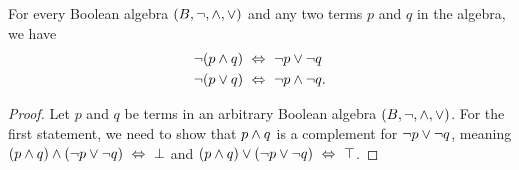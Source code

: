 \begin{theorem}
    For every Boolean algebra $(B, \neg, \wedge, \vee)$ and any two terms $p$ and $q$ in the algebra,
    we have
    \begin{align*}
        \neg (p \wedge q) &~\Leftrightarrow~ \neg p \vee \neg q\\
        \neg (p \vee q) &~\Leftrightarrow~ \neg p \wedge \neg q.
    \end{align*}
\end{theorem}
\begin{proof}
    Let $p$ and $q$ be terms in an arbitrary Boolean algebra $(B, \neg, \wedge, \vee)$.
    For the first statement, we need to show that $p \wedge q$ is a complement for $\neg p \vee \neg q$,
    meaning $(p \wedge q) \wedge (\neg p \vee \neg q) ~\Leftrightarrow~ \bot$
    and $(p \wedge q) \vee (\neg p \vee \neg q) ~\Leftrightarrow~ \top$.


\end{proof}
